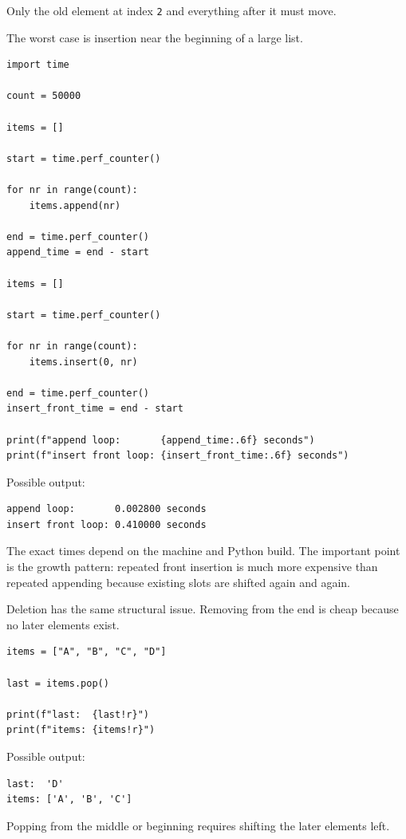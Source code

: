 Only the old element at index \texttt{2} and everything after it must move.

The worst case is insertion near the beginning of a large list.

\begin{verbatim}
import time

count = 50000

items = []

start = time.perf_counter()

for nr in range(count):
    items.append(nr)

end = time.perf_counter()
append_time = end - start

items = []

start = time.perf_counter()

for nr in range(count):
    items.insert(0, nr)

end = time.perf_counter()
insert_front_time = end - start

print(f"append loop:       {append_time:.6f} seconds")
print(f"insert front loop: {insert_front_time:.6f} seconds")
\end{verbatim}

Possible output:

\begin{verbatim}
append loop:       0.002800 seconds
insert front loop: 0.410000 seconds
\end{verbatim}

The exact times depend on the machine and Python build. The important point is the growth pattern: repeated front insertion is much more expensive than repeated appending because existing slots are shifted again and again.

Deletion has the same structural issue. Removing from the end is cheap because no later elements exist.

\begin{verbatim}
items = ["A", "B", "C", "D"]

last = items.pop()

print(f"last:  {last!r}")
print(f"items: {items!r}")
\end{verbatim}

Possible output:

\begin{verbatim}
last:  'D'
items: ['A', 'B', 'C']
\end{verbatim}

Popping from the middle or beginning requires shifting the later elements left.

